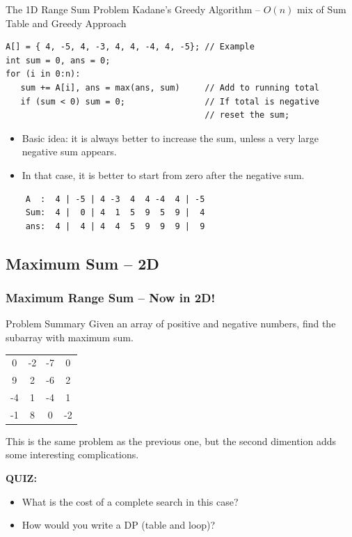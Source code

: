 \begin{frame}[fragile]{The 1D Range Sum Problem}
  {Kadane's Greedy Algorithm -- $O(n)$ mix of Sum Table and Greedy Approach}

  \begin{block}{}
      {\smaller
\begin{verbatim}
A[] = { 4, -5, 4, -3, 4, 4, -4, 4, -5}; // Example
int sum = 0, ans = 0;
for (i in 0:n):
   sum += A[i], ans = max(ans, sum)     // Add to running total
   if (sum < 0) sum = 0;                // If total is negative
                                        // reset the sum;
\end{verbatim}
      }
  \end{block}

\begin{itemize}
\item Basic idea: it is always better to increase the sum,
unless a very large negative sum appears.
\item In that case, it is better to start from zero after the negative sum.
\end{itemize}
\begin{verbatim}
    A  :  4 | -5 | 4 -3  4  4 -4  4 | -5
    Sum:  4 |  0 | 4  1  5  9  5  9 |  4
    ans:  4 |  4 | 4  4  5  9  9  9 |  9
\end{verbatim}
\end{frame}

\subsection{Maximum Sum -- 2D}
\begin{frame}
  \frametitle{Maximum Range Sum -- Now in 2D!}
  \begin{block}{Problem Summary}
    Given an array of positive and negative numbers, find the
    subarray with maximum sum.
  \end{block}
  \begin{center}
    \begin{tabular}{|cccc|}
      \hline
      0 & -2 & -7 & 0\\
      9 & 2 & -6 & 2\\
      -4 & 1 & -4 & 1\\
      -1 & 8 & 0 & -2\\
      \hline
    \end{tabular}
  \end{center}
  \bigskip

  This is the same problem as the previous one, but the second dimention adds some interesting complications.\bigskip

  {\bf QUIZ:}
  \begin{itemize}
    \item What is the cost of a complete search in this case?
    \item How would you write a DP (table and loop)?
  \end{itemize}
\end{frame}

